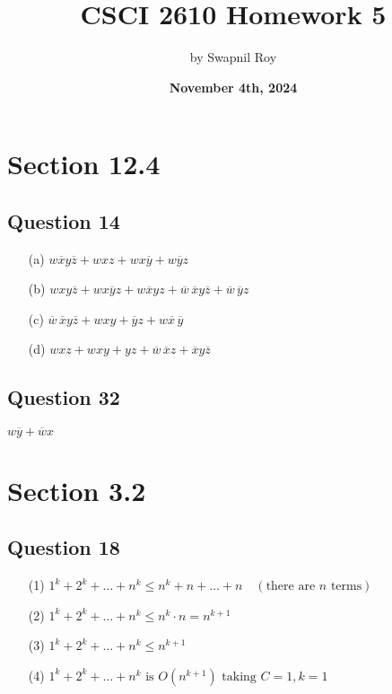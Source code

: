 \documentclass{article}
\title{\textbf{CSCI 2610 Homework 5}}
\date{\textbf{November 4th, 2024}}
\author{by Swapnil Roy}
\begin{document}
\maketitle
\raggedright

\section*{Section 12.4}

\subsection*{Question 14}
\begin{itemize}
        \item[(a)]$w\overline{x}y\overline{z} + wxz + wx\overline{y} + w\overline{y}z$
        \item[(b)] $wxy\overline{z} + wx\overline{y}z + w\overline{x}yz + \overline{w}\,\overline{x}y\overline{z} + \overline{w}\,\overline{y}z$
        \item[(c)] $\overline{w}\,\overline{x}y\overline{z} + wxy + \overline{y}z + w\overline{x}\,\overline{y}$
        \item[(d)] $wxz + wxy + yz + \overline{w}\,\overline{x}z + \overline{x}y\overline{z}$
\end{itemize}

\subsection*{Question 32}
    $w\overline{y} + \overline{w}x$

\section*{Section 3.2}

\subsection*{Question 18}
\begin{itemize}
    \item[(1)] \( 1^k + 2^k + \ldots + n^k \leq n^k + n + \ldots + n \quad (\text{there are } n \text{ terms}) \)
    \item[(2)] \( 1^k + 2^k + \ldots + n^k \leq n^k \cdot n = n^{k+1} \)
    \item[(3)] \( 1^k + 2^k + \ldots + n^k \leq n^{k+1} \)
    \item[(4)] \( 1^k + 2^k + \ldots + n^k \text{ is } O(n^{k+1}) \text{ taking } C = 1, k = 1 \)
\end{itemize}
\end{document}

